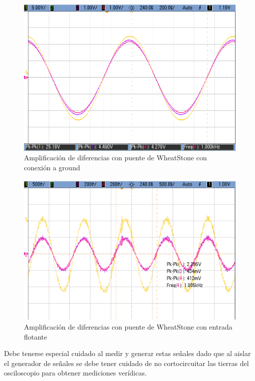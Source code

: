 \begin{figure}[H]
	\centering
	\includegraphics[height=0.3\textheight]{./ImagenesDeOsciloscopio/WheatStoneTierra1.png}
	\caption{Amplificación de diferencias con puente de WheatStone con conexión a ground}
\end{figure}

\begin{figure}[H]
	\centering
	\includegraphics[height=0.3\textheight]{./ImagenesDeOsciloscopio/WheatstoneAislado.png}
	\caption{Amplificación de diferencias con puente de WheatStone con entrada flotante}
\end{figure}


Debe tenerse especial cuidado al medir y generar estas señales dado que al aislar el generador de señales se debe tener cuidado de no cortocircuitar las tierras del osciloscopio para obtener mediciones verídicas.

